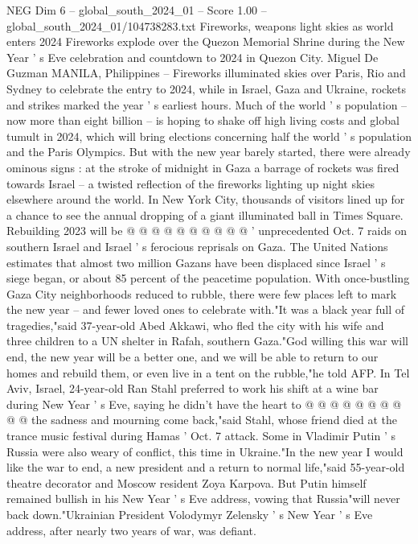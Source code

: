 \begin{textsample}{NEG Dim 6 – global\_south\_2024\_01 – Score 1.00 – global\_south\_2024\_01/104738283.txt}  \label{ex:f6_neg_349}
Fireworks, weapons light skies as world enters 2024 Fireworks explode over the Quezon Memorial Shrine during the New Year ' s Eve celebration and countdown to 2024 in Quezon City.
Miguel De Guzman MANILA, Philippines -- Fireworks illuminated skies over Paris, Rio and Sydney to celebrate the entry to 2024, while in Israel, Gaza and Ukraine, rockets and strikes marked the year ' s earliest hours.
Much of the world ' s population -- now more than eight billion -- is hoping to shake off high living costs and global tumult in 2024, which will bring elections concerning half the world ' s population and the Paris Olympics.
But with the new year barely started, there were already ominous signs : at the stroke of midnight in Gaza a barrage of rockets was fired towards Israel -- a twisted reflection of the fireworks lighting up night skies elsewhere around the world.
In New York City, thousands of visitors lined up for a chance to see the annual dropping of a giant illuminated ball in Times Square.
Rebuilding 2023 will be @ @ @ @ @ @ @ @ @ @ ' unprecedented Oct. 7 raids on southern Israel and Israel ' s ferocious reprisals on Gaza.
The United Nations estimates that almost two million Gazans have been displaced since Israel ' s siege began, or about 85 percent of the peacetime population.
With once-bustling Gaza City neighborhoods reduced to rubble, there were few places left to mark the new year -- and fewer loved ones to celebrate with."It was a black year full of tragedies,"said 37-year-old Abed Akkawi, who fled the city with his wife and three children to a UN shelter in Rafah, southern Gaza."God willing this war will end, the new year will be a better one, and we will be able to return to our homes and rebuild them, or even live in a tent on the rubble,"he told AFP.
In Tel Aviv, Israel, 24-year-old Ran Stahl preferred to work his shift at a wine bar during New Year ' s Eve, saying he didn't have the heart to @ @ @ @ @ @ @ @ @ @ the sadness and mourning come back,"said Stahl, whose friend died at the trance music festival during Hamas ' Oct. 7 attack.
Some in Vladimir Putin ' s Russia were also weary of conflict, this time in Ukraine."In the new year I would like the war to end, a new president and a return to normal life,"said 55-year-old theatre decorator and Moscow resident Zoya Karpova.
But Putin himself remained bullish in his New Year ' s Eve address, vowing that Russia"will never back down."Ukrainian President Volodymyr Zelensky ' s New Year ' s Eve address, after nearly two years of war, was defiant.

\end{textsample}
